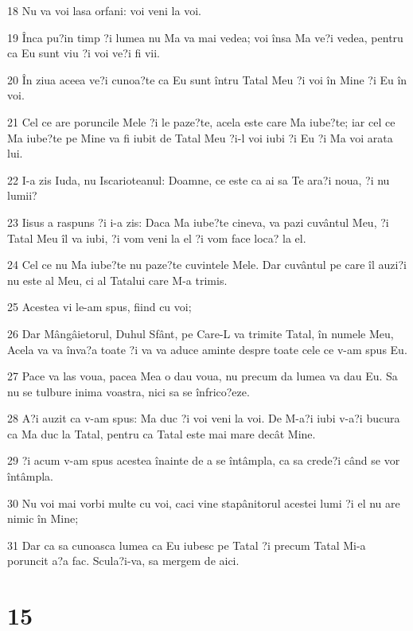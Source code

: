 \par 18 Nu va voi lasa orfani: voi veni la voi.
\par 19 Înca pu?in timp ?i lumea nu Ma va mai vedea; voi însa Ma ve?i vedea, pentru ca Eu sunt viu ?i voi ve?i fi vii.
\par 20 În ziua aceea ve?i cunoa?te ca Eu sunt întru Tatal Meu ?i voi în Mine ?i Eu în voi.
\par 21 Cel ce are poruncile Mele ?i le paze?te, acela este care Ma iube?te; iar cel ce Ma iube?te pe Mine va fi iubit de Tatal Meu ?i-l voi iubi ?i Eu ?i Ma voi arata lui.
\par 22 I-a zis Iuda, nu Iscarioteanul: Doamne, ce este ca ai sa Te ara?i noua, ?i nu lumii?
\par 23 Iisus a raspuns ?i i-a zis: Daca Ma iube?te cineva, va pazi cuvântul Meu, ?i Tatal Meu îl va iubi, ?i vom veni la el ?i vom face loca? la el.
\par 24 Cel ce nu Ma iube?te nu paze?te cuvintele Mele. Dar cuvântul pe care îl auzi?i nu este al Meu, ci al Tatalui care M-a trimis.
\par 25 Acestea vi le-am spus, fiind cu voi;
\par 26 Dar Mângâietorul, Duhul Sfânt, pe Care-L va trimite Tatal, în numele Meu, Acela va va înva?a toate ?i va va aduce aminte despre toate cele ce v-am spus Eu.
\par 27 Pace va las voua, pacea Mea o dau voua, nu precum da lumea va dau Eu. Sa nu se tulbure inima voastra, nici sa se înfrico?eze.
\par 28 A?i auzit ca v-am spus: Ma duc ?i voi veni la voi. De M-a?i iubi v-a?i bucura ca Ma duc la Tatal, pentru ca Tatal este mai mare decât Mine.
\par 29 ?i acum v-am spus acestea înainte de a se întâmpla, ca sa crede?i când se vor întâmpla.
\par 30 Nu voi mai vorbi multe cu voi, caci vine stapânitorul acestei lumi ?i el nu are nimic în Mine;
\par 31 Dar ca sa cunoasca lumea ca Eu iubesc pe Tatal ?i precum Tatal Mi-a poruncit a?a fac. Scula?i-va, sa mergem de aici.

\chapter{15}

